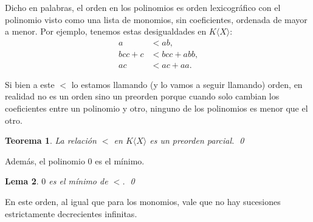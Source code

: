\documentclass[12pt]{report}
\theoremstyle{customstyle}
\newtheorem{theorem}{Teorema}[chapter]
\newtheorem{lemma}[theorem]{Lema}
\theoremstyle{factstyle}
\begin{document}
Dicho en palabras, el orden en los polinomios es orden lexicográfico con el polinomio visto como una lista de monomios, sin coeficientes, ordenada de mayor a menor. Por ejemplo, tenemos estas desigualdades en $K⟨X⟩$:
\begin{align*}
  a &< ab \text{,} \\
  bcc + c &< bcc + abb \text{,} \\
  ac &< ac + aa \text{.}
\end{align*}

Si bien a este $<$ lo estamos llamando (y lo vamos a seguir llamando) orden, en realidad no es un orden sino un preorden porque cuando solo cambian los coeficientes entre un polinomio y otro, ninguno de los polinomios es menor que el otro.

\begin{theorem}
  La relación $<$ en $K⟨X⟩$ es un preorden parcial.
  \qed
\end{theorem}

Además, el polinomio $0$ es el mínimo.

\begin{lemma}\label{lemma:0 es mínimo}
  $0$ es el mínimo de $<$.
  \qed
\end{lemma}

En este orden, al igual que para los monomios, vale que no hay sucesiones estrictamente decrecientes infinitas.
\end{document}
